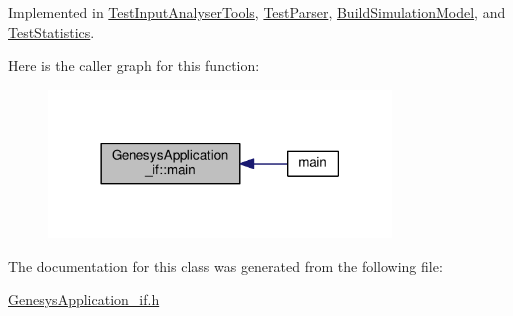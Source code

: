 Implemented in \hyperlink{class_test_input_analyser_tools_a8015a3024f29bddc865cb0b419214cd7}{Test\+Input\+Analyser\+Tools}, \hyperlink{class_test_parser_ae1421b04c5b7420e8d542ebefe46f70e}{Test\+Parser}, \hyperlink{class_build_simulation_model_a8c50f55d7293860e5e7bc7e7e74f8d4a}{Build\+Simulation\+Model}, and \hyperlink{class_test_statistics_a5311e246afefb4778d3fcf06c5c4c756}{Test\+Statistics}.



Here is the caller graph for this function\+:\nopagebreak
\begin{figure}[H]
\begin{center}
\leavevmode
\includegraphics[width=258pt]{class_genesys_application__if_a2b07e7803b410a4a8d0f87422dabb004_icgraph}
\end{center}
\end{figure}




The documentation for this class was generated from the following file\+:\begin{DoxyCompactItemize}
\item 
\hyperlink{_genesys_application__if_8h}{Genesys\+Application\+\_\+if.\+h}\end{DoxyCompactItemize}
